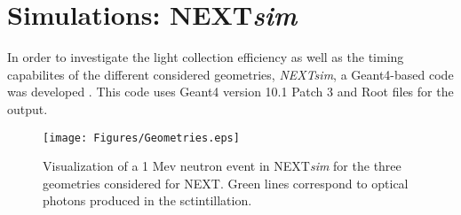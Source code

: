 %
%
%
%
%
%
%
%
%
%
%
%
%
%
%
%
%
%
%
%
%
%


\section{Simulations: NEXT\emph{sim}}

In order to investigate the light collection efficiency as well as the timing capabilites of the different considered geometries, \emph{NEXTsim}, a {\sc Geant4}-based code was developed \cite{AGOSTINELLI2003250,ALLISON2016186}. This code uses  {\sc Geant4} version 10.1 Patch 3 and {\sc Root} files for the output.

\begin{figure*}[hbt]
\centering
\texttt{[image: Figures/Geometries.eps]}
\caption{Visualization of a 1 Mev neutron event in NEXT\emph{sim} for the three  geometries considered for NEXT. Green lines correspond to optical photons produced in the sctintillation.}
\label{fig:Geometries}
\end{figure*} 

